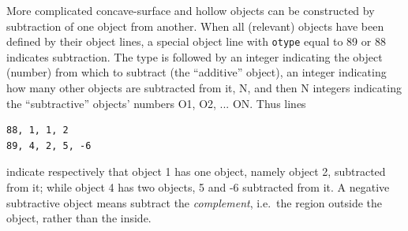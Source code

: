 \documentclass[12pt]{article}
\begin{document}
More complicated concave-surface and hollow objects can be constructed
by subtraction of one object from another. When all (relevant) objects
have been defined by their object lines, a special object line with
\verb!otype! equal to 89 or 88 indicates subtraction. The type is
followed by an integer indicating the object (number) from which to
subtract (the ``additive'' object), an integer indicating how many
other objects are subtracted from it, N, and then N integers
indicating the ``subtractive'' objects' numbers O1, O2, ... ON. Thus lines
\begin{verbatim}
88, 1, 1, 2
89, 4, 2, 5, -6
\end{verbatim}
indicate respectively that object 1 has one object, namely object 2,
subtracted from it; while object 4 has two objects, 5 and -6
subtracted from it. A negative subtractive object means subtract the
\emph{complement}, i.e.\ the region outside the object, rather than
the inside.
\end{document}
